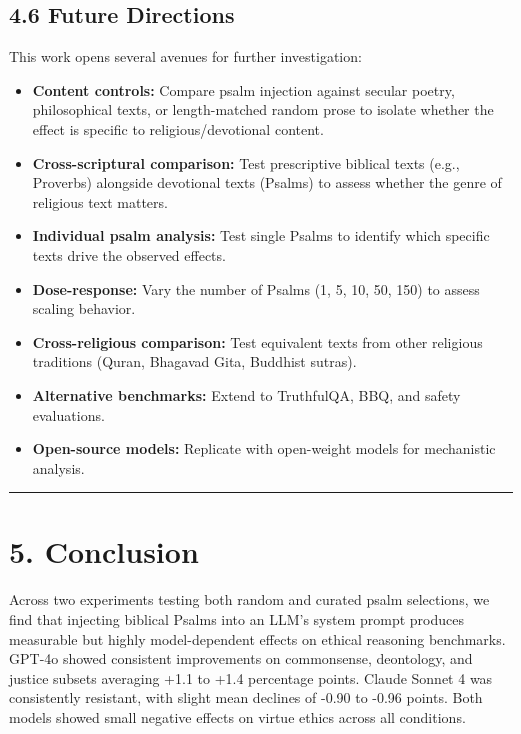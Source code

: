 \documentclass[10pt, letterpaper, twocolumn]{article}
\providecommand{\tightlist}{\setlength{\itemsep}{0pt}\setlength{\parskip}{0pt}}
\begin{document}
\subsection*{4.6 Future Directions}\label{future-directions}

This work opens several avenues for further investigation:

\begin{itemize}
\tightlist
\item
  \textbf{Content controls:} Compare psalm injection against secular poetry, philosophical texts, or length-matched random prose to isolate whether the effect is specific to religious/devotional content.
\item
  \textbf{Cross-scriptural comparison:} Test prescriptive biblical texts (e.g., Proverbs) alongside devotional texts (Psalms) to assess whether the genre of religious text matters.
\item
  \textbf{Individual psalm analysis:} Test single Psalms to identify which specific texts drive the observed effects.
\item
  \textbf{Dose-response:} Vary the number of Psalms (1, 5, 10, 50, 150) to assess scaling behavior.
\item
  \textbf{Cross-religious comparison:} Test equivalent texts from other religious traditions (Quran, Bhagavad Gita, Buddhist sutras).
\item
  \textbf{Alternative benchmarks:} Extend to TruthfulQA, BBQ, and safety evaluations.
\item
  \textbf{Open-source models:} Replicate with open-weight models for mechanistic analysis.
\end{itemize}

\begin{center}\rule{0.5\linewidth}{0.5pt}\end{center}

\section*{5. Conclusion}\label{conclusion}

Across two experiments testing both random and curated psalm selections, we find that injecting biblical Psalms into an LLM's system prompt produces measurable but highly model-dependent effects on ethical reasoning benchmarks. GPT-4o showed consistent improvements on commonsense, deontology, and justice subsets averaging +1.1 to +1.4 percentage points. Claude Sonnet 4 was consistently resistant, with slight mean declines of -0.90 to -0.96 points. Both models showed small negative effects on virtue ethics across all conditions.
\end{document}
